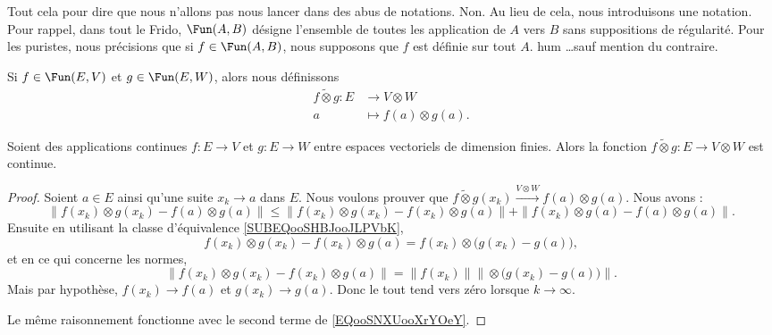 Tout cela pour dire que nous n'allons pas nous lancer dans des abus de notations. Non. Au lieu de cela, nous introduisons une notation. Pour rappel, dans tout le Frido, \( \Fun(A,B)\) désigne l'ensemble de toutes les application de \( A\) vers \( B\) sans suppositions de régularité. Pour les puristes, nous précisions que si \( f\in\Fun(A,B)\), nous supposons que \( f\) est définie sur tout \( A\). hum \ldots sauf mention du contraire.
\begin{definition}      \label{DEFooMVNDooFWFtRn}
    Si \( f\in \Fun(E,V)\) et \( g\in \Fun(E,W)\), alors nous définissons
    \begin{equation}
        \begin{aligned}
            f\tilde\otimes g\colon E&\to V\otimes W \\
            a&\mapsto f(a)\otimes g(a). 
        \end{aligned}
    \end{equation}
\end{definition}

\begin{proposition}     \label{PROPooCRVXooEGxdZl}
    Soient des applications continues \( f\colon E\to V\) et \( g\colon E\to W\) entre espaces vectoriels de dimension finies. Alors la fonction \( f\tilde\otimes g\colon E\to V\otimes W\) est continue.
\end{proposition}

\begin{proof}
    Soient \( a\in E\) ainsi qu'une suite \( x_k\to a\) dans \( E\). Nous voulons prouver que \( f\tilde\otimes g(x_k)\stackrel{V\otimes W}{\longrightarrow}f(a)\otimes g(a)\). Nous avons :
    \begin{equation}        \label{EQooSNXUooXrYOeY}
        \| f(x_k)\otimes g(x_k)-f(a)\otimes g(a) \|\leq \| f(x_k)\otimes g(x_k)-f(x_k)\otimes g(a) \|+\| f(x_k)\otimes g(a)-f(a)\otimes g(a) \|.
    \end{equation}
    Ensuite en utilisant la classe d'équivalence \eqref{SUBEQooSHBJooJLPVbK}, 
    \begin{equation}
        f(x_k)\otimes g(x_k)-f(x_k)\otimes g(a)=f(x_k)\otimes \big( g(x_k)-g(a) \big),
    \end{equation}
    et en ce qui concerne les normes,
    \begin{equation}
    \|   f(x_k)\otimes g(x_k)-f(x_k)\otimes g(a)\|  =\|f(x_k)\|  \|\otimes \big( g(x_k)-g(a) \big)\|.
    \end{equation}
    Mais par hypothèse, \( f(x_k)\to f(a)\) et \( g(x_k)\to g(a)\). Donc le tout tend vers zéro lorsque \( k\to \infty\).

    Le même raisonnement fonctionne avec le second terme de \eqref{EQooSNXUooXrYOeY}.
\end{proof}

